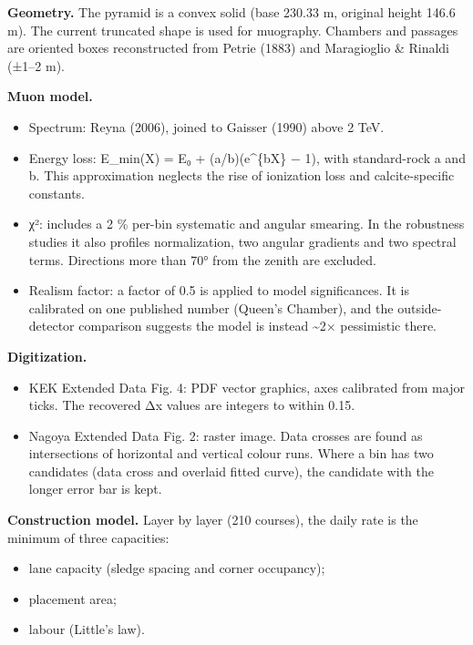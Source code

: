 \documentclass[
]{article}
\providecommand{\tightlist}{%
  \setlength{\itemsep}{0pt}\setlength{\parskip}{0pt}}
\begin{document}
\textbf{Geometry.} The pyramid is a convex solid (base 230.33 m,
original height 146.6 m). The current truncated shape is used for
muography. Chambers and passages are oriented boxes reconstructed from
Petrie (1883) and Maragioglio \& Rinaldi (±1--2 m).

\textbf{Muon model.}

\begin{itemize}
\tightlist
\item
  Spectrum: Reyna (2006), joined to Gaisser (1990) above 2 TeV.
\item
  Energy loss: E\_min(X) = E₀ + (a/b)(e\^{}\{bX\} − 1), with
  standard-rock a and b. This approximation neglects the rise of
  ionization loss and calcite-specific constants.
\item
  χ²: includes a 2 \% per-bin systematic and angular smearing. In the
  robustness studies it also profiles normalization, two angular
  gradients and two spectral terms. Directions more than 70° from the
  zenith are excluded.
\item
  Realism factor: a factor of 0.5 is applied to model significances. It
  is calibrated on one published number (Queen's Chamber), and the
  outside-detector comparison suggests the model is instead
  \textasciitilde2× pessimistic there.
\end{itemize}

\textbf{Digitization.}

\begin{itemize}
\tightlist
\item
  KEK Extended Data Fig. 4: PDF vector graphics, axes calibrated from
  major ticks. The recovered Δx values are integers to within 0.15.
\item
  Nagoya Extended Data Fig. 2: raster image. Data crosses are found as
  intersections of horizontal and vertical colour runs. Where a bin has
  two candidates (data cross and overlaid fitted curve), the candidate
  with the longer error bar is kept.
\end{itemize}

\textbf{Construction model.} Layer by layer (210 courses), the daily
rate is the minimum of three capacities:

\begin{itemize}
\tightlist
\item
  lane capacity (sledge spacing and corner occupancy);
\item
  placement area;
\item
  labour (Little's law).
\end{itemize}
\end{document}
